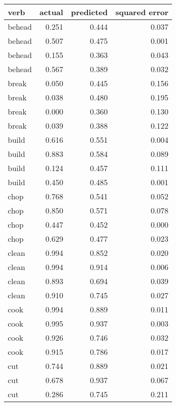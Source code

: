 \begin{longtable}{l|rrr}
\textbf{verb} & \textbf{actual} & \textbf{predicted} & \textbf{squared error} \\
\hline
\endhead
behead    & 0.251  & 0.444     & 0.037         \\
behead    & 0.507  & 0.475     & 0.001         \\
behead    & 0.155  & 0.363     & 0.043         \\
behead    & 0.567  & 0.389     & 0.032         \\
break     & 0.050   & 0.445     & 0.156         \\
break     & 0.038  & 0.480      & 0.195         \\
break     & 0.000      & 0.360      & 0.130          \\
break     & 0.039  & 0.388     & 0.122         \\
build     & 0.616  & 0.551     & 0.004         \\
build     & 0.883  & 0.584     & 0.089         \\
build     & 0.124  & 0.457     & 0.111         \\
build     & 0.450   & 0.485     & 0.001         \\
chop      & 0.768  & 0.541     & 0.052         \\
chop      & 0.850   & 0.571     & 0.078         \\
chop      & 0.447  & 0.452     & 0.000             \\
chop      & 0.629  & 0.477     & 0.023         \\
clean     & 0.994  & 0.852     & 0.020          \\
clean     & 0.994  & 0.914     & 0.006         \\
clean     & 0.893  & 0.694     & 0.039         \\
clean     & 0.910   & 0.745     & 0.027         \\
cook      & 0.994  & 0.889     & 0.011         \\
cook      & 0.995  & 0.937     & 0.003         \\
cook      & 0.926  & 0.746     & 0.032         \\
cook      & 0.915  & 0.786     & 0.017         \\
cut       & 0.744  & 0.889     & 0.021         \\
cut       & 0.678  & 0.937     & 0.067         \\
cut       & 0.286  & 0.745     & 0.211         \\

\end{longtable}

